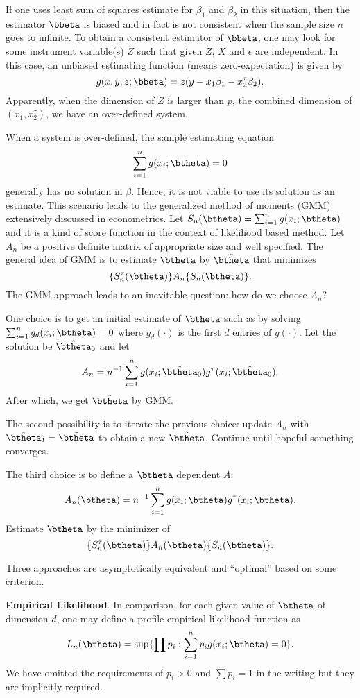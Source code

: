 If one uses least sum of squares estimate for $\beta_1$ 
and $\beta_2$ in this
situation, then the estimator $\hat \bbeta$ is biased and in fact
is not consistent when the sample size $n$ goes to infinite.
To obtain a consistent estimator of $\bbeta$, one may look
for some instrument variable(s) $Z$ such that given $Z$,
$X$ and $\epsilon$ are independent. 
In this case, an unbiased estimating function (means zero-expectation)
is given by
\[
g(x, y,  z; \bbeta) = z ( y - x_1 \beta_1 - x_2^\tau \beta_2).
\]
Apparently, when the dimension of $Z$ is larger than $p$, the
combined dimension
of $(x_1, x_2^\tau)$, we have an over-defined system.

When a system is over-defined, the sample estimating equation
\[
\sum_{i=1}^n g(x_i; \btheta) = 0
\]
generally has no solution in $\beta$. Hence, it is not viable to
use its solution as an estimate. This scenario leads to the generalized
method of moments (GMM) extensively discussed in econometrics.
Let $S_n(\btheta) = \sum_{i=1}^n g(x_i; \btheta)$ and it is a kind
of score function in the context of likelihood based method.
Let $A_n$ be a positive definite matrix of appropriate size
and well specified. 
The general idea of GMM is to estimate $\btheta$
by
$\tilde \btheta$ that minimizes
\[
\{S^\tau_n (\btheta)\} A_n \{S_n(\btheta)\}.
\]
The GMM approach leads to an inevitable question: how do
we choose $A_n$?

One choice is to get an initial estimate of $\btheta$ such as by solving
$\sum_{i=1}^n g_d (x_i; \btheta) = 0$ where $g_d(\cdot)$ is the first
$d$ entries of $g(\cdot)$. Let the solution be $\hat \btheta_0$ and
let
\[
A_n = n^{-1} \sum_{i=1}^n g(x_i; \hat \btheta_0) g^\tau (x_i; \hat \btheta_0).
\]
After which, we get $\tilde \btheta$ by GMM.

The second possibility is to iterate the previous choice:
update $A_n$ with $\hat \btheta_1 = \tilde \btheta$ to obtain a
new $\tilde \btheta$. Continue until hopeful something converges.

The third choice is to define a $\btheta$ dependent $A$:
\[
A_n(\btheta)  = n^{-1} \sum_{i=1}^n g(x_i; \btheta) g^\tau (x_i; \btheta).
\]
Estimate $\btheta$ by the minimizer of
\[
\{S^\tau_n (\btheta)\} A_n(\btheta) \{S_n(\btheta)\}.
\]

Three approaches are asymptotically equivalent and ``optimal'' based on
some criterion.

\vs\vs
\noindent
{\bf Empirical Likelihood}.
In comparison, for each given value of $\btheta$ of dimension $d$, one may
define a profile empirical likelihood function as
\[
L_n(\btheta) = \sup \{ \prod p_i : \sum_{i=1}^n p_i g(x_i; \btheta) = 0\}.
\]
We have omitted the requirements of $p_i > 0$ and $\sum p_i = 1$ in
the writing but they are implicitly required.

